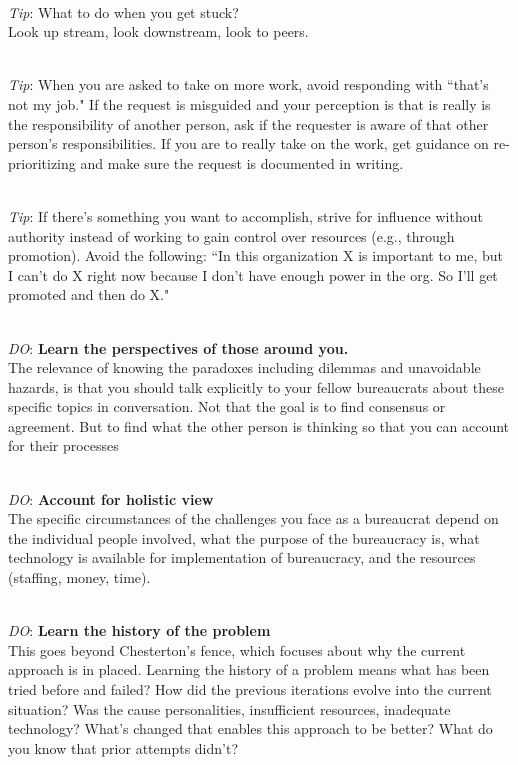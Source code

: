 \ \\
\textit{Tip}: What to do when you get stuck?\\
Look up stream, look downstream, look to peers.

\ \\
\textit{Tip}: When you are asked to take on more work, avoid responding with ``that's not my job." If the request is misguided and your perception is that is really is the responsibility of another person, ask if the requester is aware of that other person's responsibilities. If you are to really take on the work, get guidance on re-prioritizing and make sure the request is documented in writing. 

\ \\
\textit{Tip}: If there's something you want to accomplish, strive for influence without authority instead of working to gain control over resources (e.g., through promotion). Avoid the following: ``In this organization X is important to me, but I can't do X right now because I don't have enough power in the org. So I'll get promoted and then do X."

\ \\
\textit{DO}: \textbf{Learn the perspectives of those around you.}\\
The relevance of knowing the paradoxes including dilemmas and unavoidable hazards, is that you should talk explicitly to your fellow bureaucrats about these specific topics in conversation. Not that the goal is to find consensus or agreement. But to find what the other person is thinking so that you can account for their processes

\ \\
\textit{DO}: \textbf{Account for holistic view}\\
The specific circumstances of the challenges you face as a bureaucrat depend on the individual people involved, what the purpose of the bureaucracy is, what technology is available for implementation of bureaucracy, and the resources (staffing, money, time). 

\ \\
\textit{DO}: \textbf{Learn the history of the problem}\\
This goes beyond Chesterton's fence, which focuses about why the current approach is in placed. Learning the history of a problem means what has been tried before and failed? How did the previous iterations evolve into the current situation? Was the cause personalities, insufficient resources, inadequate technology? What's changed that enables this approach to be better? What do you know that prior attempts didn't?

